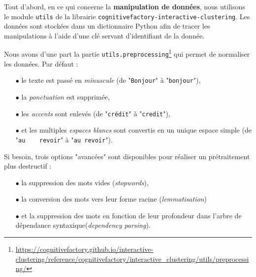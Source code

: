		Tout d'abord, en ce qui concerne la \textbf{manipulation de données}, nous utilisons le module \texttt{utils} de la librairie \texttt{cognitivefactory-interactive-clustering}. Les données sont stockées dans un dictionnaire Python afin de tracer les manipulations à l'aide d'une clé servant d'identifiant de la donnée.
		
		Nous avons d'une part la partie \texttt{utils.preprocessing}\footnote{\url{https://cognitivefactory.github.io/interactive-clustering/reference/cognitivefactory/interactive_clustering/utils/preprocessing/}} qui permet de normaliser les données.
		Par défaut :

		\begin{itemize}
			\item[\(\bullet\)] le texte est passé en \textit{minuscule} (de "\texttt{Bonjour}" à "\texttt{bonjour}"),
			\item[\(\bullet\)] la \textit{ponctuation} est supprimée, %
			\item[\(\bullet\)] les \textit{accents} sont enlevés (de "\texttt{crédit}" à "\texttt{credit}"),
			\item[\(\bullet\)] et les multiples \textit{espaces blancs} sont convertis en un unique espace simple (de "\texttt{au~~~~revoir}" à "\texttt{au revoir}").
		\end{itemize}
		
		Si besoin, trois options "avancées" sont disponibles pour réaliser un prétraitement plus destructif :

		\begin{itemize}
			\item[\(\bullet\)] la suppression des mots vides (\textit{stopwords}),
			\item[\(\bullet\)] la conversion des mots vers leur forme racine (\textit{lemmatisation})
			\item[\(\bullet\)] et la suppression des mots en fonction de leur profondeur dans l'arbre de dépendance syntaxique(\textit{dependency parsing}).
		\end{itemize}
		
